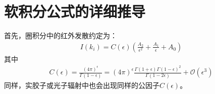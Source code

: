 ﻿%
\chapter{软积分公式的详细推导}
\label{chap:softIntegral}

首先，圈积分中的红外发散约定为：
\begin{eqnarray}
I({k_i}) = C(\epsilon)\left(\frac{A_2}{\epsilon^2} + \frac{A_1}{\epsilon} + A_0\right)
\end{eqnarray}
其中
\begin{eqnarray}
C(\epsilon) = \frac{(4\pi)^{\epsilon}}{\Gamma(1-\epsilon)} = (4\pi)^{\epsilon}
\frac{\Gamma(1+\epsilon)\Gamma(1-\epsilon)^2}{\Gamma(1-2\epsilon)} + \mathcal{O}(\epsilon^3)
\end{eqnarray}
同样，实胶子或光子辐射中也会出现同样的公因子$C(\epsilon)$。


